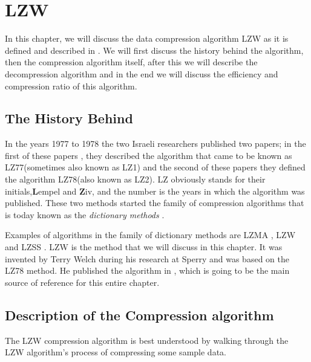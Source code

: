 \begin{comment}
  
\end{comment}

\chapter{LZW}
\label{cha:lzw}

In this chapter, we will discuss the data compression algorithm LZW as
it is defined and described in
\cite{nelson89:_lzw_data_compr,Welch:1984:THD:1319729.1320134,Salomon:2004:DCC}. We
will first discuss the history behind the algorithm, then the
compression algorithm itself, after this we will describe the
decompression algorithm and in the end we will discuss the efficiency
and compression ratio of this algorithm.

\section{The History Behind}

In the years 1977 to 1978 the two Israeli researchers published two
papers; in the first of these papers \cite{Ziv77auniversal}, they
described the algorithm that came to be known as LZ77(sometimes also
known as LZ1) and the second of these papers \cite{Ziv78compressionof}
they defined the algorithm LZ78(also known as LZ2). LZ obviously
stands for their initials,\textbf{L}empel and \textbf{Z}iv, and the
number is the years in which the algorithm was published. These two
methods started the family of compression algorithms that is today
known as the \textit{dictionary methods}
\cite{Salomon:2004:DCC,roelofs99:_png,winters:_us_paten_adapt}.

Examples of algorithms in the family of dictionary methods are LZMA
\cite{palov11}, LZW and LZSS \cite{Salomon:2004:DCC}. LZW is the
method that we will discuss in this chapter. It was invented by Terry
Welch during his research at Sperry and was based on the LZ78
method. He published the algorithm in \cite{welch85:_u}, which is
going to be the main source of reference for this entire
chapter. \cite{roelofs99:_png}

\section{Description of the Compression algorithm}
\label{sec:lzw-comp-desc}

The LZW compression algorithm is best
understood by walking through the LZW algorithm's process of
compressing some sample data.

